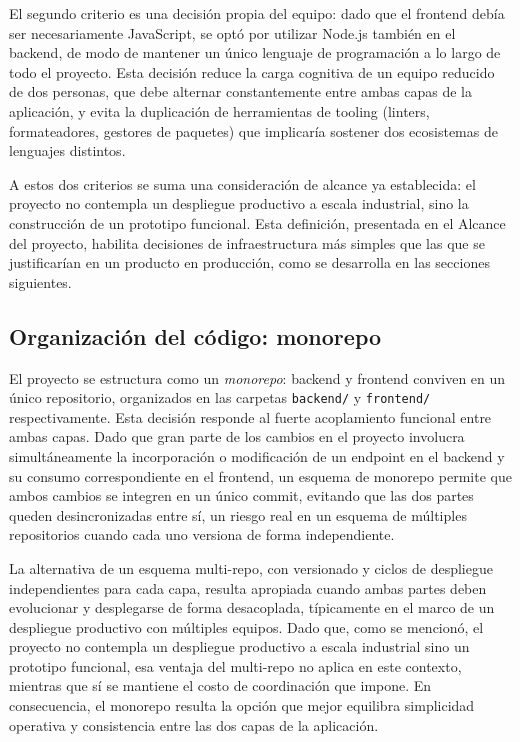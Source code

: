 El segundo criterio es una decisión propia del equipo: dado que el frontend debía ser necesariamente JavaScript, se optó por utilizar Node.js también en el backend, de modo de mantener un único lenguaje de programación a lo largo de todo el proyecto. Esta decisión reduce la carga cognitiva de un equipo reducido de dos personas, que debe alternar constantemente entre ambas capas de la aplicación, y evita la duplicación de herramientas de tooling (linters, formateadores, gestores de paquetes) que implicaría sostener dos ecosistemas de lenguajes distintos.

A estos dos criterios se suma una consideración de alcance ya establecida: el proyecto no contempla un despliegue productivo a escala industrial, sino la construcción de un prototipo funcional. Esta definición, presentada en el Alcance del proyecto, habilita decisiones de infraestructura más simples que las que se justificarían en un producto en producción, como se desarrolla en las secciones siguientes.

\subsection{Organización del código: monorepo}
\label{sec:monorepo}

El proyecto se estructura como un \emph{monorepo}: backend y frontend conviven en un único repositorio, organizados en las carpetas \texttt{backend/} y \texttt{frontend/} respectivamente. Esta decisión responde al fuerte acoplamiento funcional entre ambas capas. Dado que gran parte de los cambios en el proyecto involucra simultáneamente la incorporación o modificación de un endpoint en el backend y su consumo correspondiente en el frontend, un esquema de monorepo permite que ambos cambios se integren en un único commit, evitando que las dos partes queden desincronizadas entre sí, un riesgo real en un esquema de múltiples repositorios cuando cada uno versiona de forma independiente.

La alternativa de un esquema multi-repo, con versionado y ciclos de despliegue independientes para cada capa, resulta apropiada cuando ambas partes deben evolucionar y desplegarse de forma desacoplada, típicamente en el marco de un despliegue productivo con múltiples equipos. Dado que, como se mencionó, el proyecto no contempla un despliegue productivo a escala industrial sino un prototipo funcional, esa ventaja del multi-repo no aplica en este contexto, mientras que sí se mantiene el costo de coordinación que impone. En consecuencia, el monorepo resulta la opción que mejor equilibra simplicidad operativa y consistencia entre las dos capas de la aplicación.

